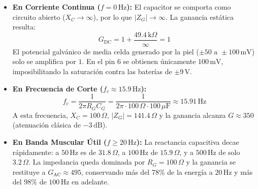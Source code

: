 \documentclass[11pt,a4paper]{article}
\begin{document}
\begin{itemize}
    \item \textbf{En Corriente Continua (\(f = 0\,\text{Hz}\)):} El capacitor se comporta como circuito abierto ($X_C \to \infty$), por lo que $|Z_G| \to \infty$. La ganancia estática resulta:
    \begin{equation}
    G_{\text{DC}} = 1 + \frac{49.4\,\text{k}\Omega}{\infty} = 1
    \end{equation}
    El potencial galvánico de media celda generado por la piel ($\pm 50\text{ a } \pm 100\,\text{mV}$) solo se amplifica por $1$. En el pin 6 se obtienen únicamente $100\,\text{mV}$, imposibilitando la saturación contra las baterías de $\pm 9\,\text{V}$.
    \item \textbf{En Frecuencia de Corte (\(f_c \approx 15.9\,\text{Hz}\)):}
    \begin{equation}
    f_c = \frac{1}{2\pi R_G C_G} = \frac{1}{2\pi \cdot 100\,\Omega \cdot 100\,\mu\text{F}} \approx 15.91\,\text{Hz}
    \end{equation}
    A esta frecuencia, $X_C = 100\,\Omega$, $|Z_G| = 141.4\,\Omega$ y la ganancia alcanza $G \approx 350$ (atenuación clásica de $-3\,\text{dB}$).
    \item \textbf{En Banda Muscular Útil (\(f \ge 20\,\text{Hz}\)):} La reactancia capacitiva decae rápidamente: a $50\,\text{Hz}$ es de $31.8\,\Omega$, a $100\,\text{Hz}$ de $15.9\,\Omega$, y a $500\,\text{Hz}$ de solo $3.2\,\Omega$. La impedancia queda dominada por $R_G = 100\,\Omega$ y la ganancia se restituye a $G_{\text{AC}} \approx 495$, conservando más del 78\% de la energía a $20\,\text{Hz}$ y más del 98\% de $100\,\text{Hz}$ en adelante.
\end{itemize}
\end{document}
